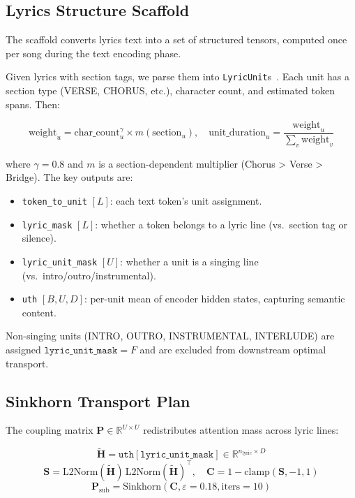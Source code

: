 \documentclass[11pt,a4paper]{article}
\begin{document}
\subsection{Lyrics Structure Scaffold}

The scaffold converts lyrics text into a set of structured tensors, computed once per song during the text encoding phase.

Given lyrics with section tags, we parse them into \texttt{LyricUnit}s~\cite{lyrics_parser}. Each unit has a section type (VERSE, CHORUS, etc.), character count, and estimated token spans. Then:

\begin{equation}
\text{weight}_u = \text{char\_count}_u^{\gamma} \times m(\text{section}_u), \quad \text{unit\_duration}_u = \frac{\text{weight}_u}{\sum_v \text{weight}_v}
\end{equation}

where $\gamma=0.8$ and $m$ is a section-dependent multiplier (Chorus > Verse > Bridge). The key outputs are:

\begin{itemize}
    \item \texttt{token\_to\_unit} $[L]$: each text token's unit assignment.
    \item \texttt{lyric\_mask} $[L]$: whether a token belongs to a lyric line (vs.\ section tag or silence).
    \item \texttt{lyric\_unit\_mask} $[U]$: whether a unit is a singing line (vs.\ intro/outro/instrumental).
    \item \texttt{uth} $[B, U, D]$: per-unit mean of encoder hidden states, capturing semantic content.
\end{itemize}

Non-singing units (INTRO, OUTRO, INSTRUMENTAL, INTERLUDE) are assigned $\texttt{lyric\_unit\_mask}=F$ and are excluded from downstream optimal transport.

\subsection{Sinkhorn Transport Plan}

The coupling matrix $\mathbf{P} \in \mathbb{R}^{U \times U}$ redistributes attention mass across lyric lines:

\[
\tilde{\mathbf{H}} = \texttt{uth}[\texttt{lyric\_unit\_mask}] \in \mathbb{R}^{n_{\text{lyric}} \times D}
\]
\[
\mathbf{S} = \text{L2Norm}(\tilde{\mathbf{H}})\,\text{L2Norm}(\tilde{\mathbf{H}})^\top, \quad \mathbf{C} = 1 - \text{clamp}(\mathbf{S}, -1, 1)
\]
\[
\mathbf{P}_{\text{sub}} = \text{Sinkhorn}(\mathbf{C}, \varepsilon=0.18, \text{iters}=10)
\]
\end{document}
